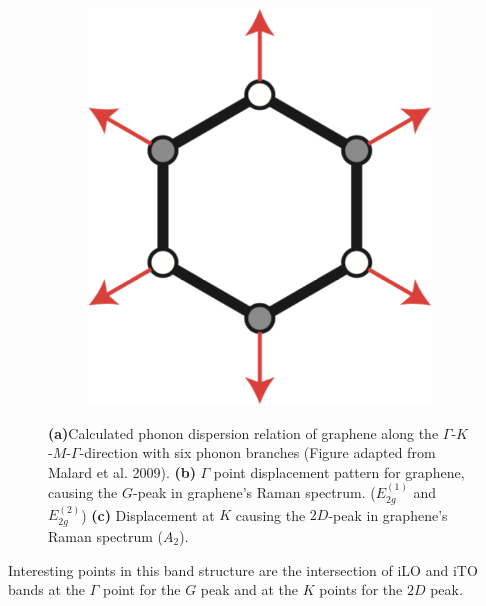 \begin{figure}[!h]
\begin{subfigure}{0.25\textwidth}
    \includegraphics[width=\textwidth]{./images/2d-mode-phonon.png}
  \end{subfigure}
  \caption{\textbf{(a)}Calculated phonon dispersion relation of graphene along the $\Gamma$-$K$-$M$-$\Gamma$-direction with six phonon branches (Figure adapted from Malard et al. 2009\mcite). \textbf{(b)} $\Gamma$ point displacement pattern for graphene, causing the $G$-peak in graphene's Raman spectrum. ($E_{2g}^{(1)}$ and $E_{2g}^{(2)}$) \textbf{(c)} Displacement at $K$ causing the $2D$-peak in graphene's Raman spectrum ($A_2$).}
  \label{fig:phonons}
\end{figure}

\newpage

Interesting points in this band structure are the intersection of iLO and iTO bands at the $\Gamma$ point for the $G$ peak and at the $K$ points for the $2D$ peak.


